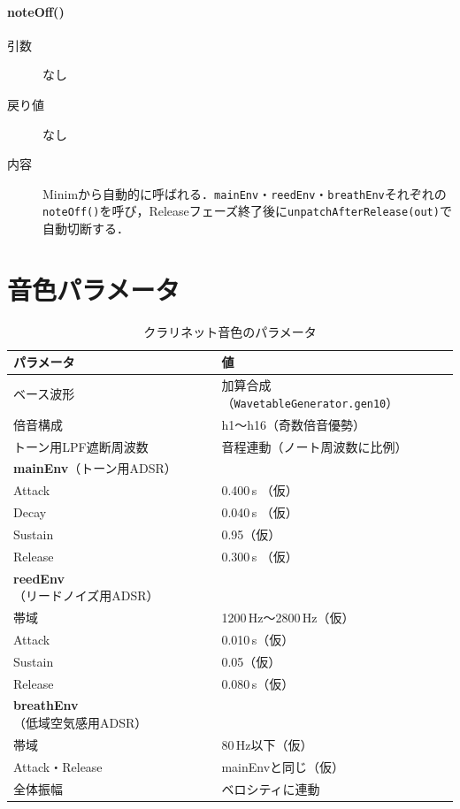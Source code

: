 \documentclass[uplatex,dvipdfmx,report]{jlreq}
\begin{document}
\paragraph{noteOff()}
\begin{description}
  \item[引数] なし
  \item[戻り値] なし
  \item[内容] Minimから自動的に呼ばれる．\verb|mainEnv|・\verb|reedEnv|・\verb|breathEnv|それぞれの\verb|noteOff()|を呼び，Releaseフェーズ終了後に\verb|unpatchAfterRelease(out)|で自動切断する．
\end{description}





\section{音色パラメータ}

\begin{table}[H]
  \centering
  \caption{クラリネット音色のパラメータ}
  \label{tab:tone}
  \begin{tabular}{l l}
    \toprule
    パラメータ & 値 \\
    \midrule
    ベース波形 & 加算合成（\verb|WavetableGenerator.gen10|） \\
    倍音構成 & h1〜h16（奇数倍音優勢） \\
    トーン用LPF遮断周波数 & 音程連動（ノート周波数に比例） \\
    \textbf{mainEnv}（トーン用ADSR） & \\
    \quad Attack & 0.400\,s （仮）\\
    \quad Decay & 0.040\,s （仮）\\
    \quad Sustain & 0.95（仮） \\
    \quad Release & 0.300\,s （仮）\\
    \textbf{reedEnv}（リードノイズ用ADSR） & \\
    \quad 帯域 & 1200\,Hz〜2800\,Hz（仮） \\
    \quad Attack & 0.010\,s（仮） \\
    \quad Sustain & 0.05（仮） \\
    \quad Release & 0.080\,s（仮） \\
    \textbf{breathEnv}（低域空気感用ADSR） & \\
    \quad 帯域 & 80\,Hz以下（仮） \\
    \quad Attack・Release & mainEnvと同じ（仮） \\
    全体振幅 & ベロシティに連動 \\
    \bottomrule
  \end{tabular}
\end{table}
\end{document}
